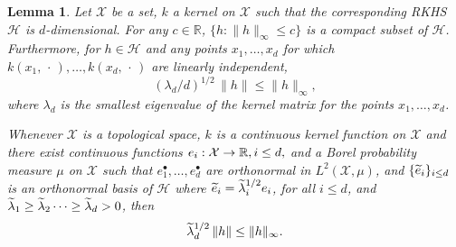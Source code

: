 \documentclass[10pt]{amsart}
\newtheorem{lemm}[theo]{Lemma}\newtheorem{prop}[theo]{Proposition}\newtheorem{coro}[theo]{Corollary}\newtheorem{conj}[theo]{Conjecture}
\theoremstyle{definition}\newtheorem{defi}[theo]{Definition}\newtheorem{rema}[theo]{Remark}\newtheorem{exam}[theo]{Example}\newtheorem{exem}[theo]{Example}\newtheorem{nota}[theo]{Notation}
\theoremstyle{remark}
\newcommand{\R}{\mathbb{R}}
\newcommand{\X}{\mathcal{X}}
\newcommand{\cH}{\mathcal{H}}
\let\oldtilde\tilde
\renewcommand*{\tilde}[1]{\mathchoice{\widetilde{#1}}{\widetilde{#1}}{\oldtilde{#1}}{\oldtilde{#1}}}
\renewcommand*{\to}{\mathchoice{\longrightarrow}{\rightarrow}{\rightarrow}{\rightarrow}}
\begin{document}
\begin{lemm}\label{lem:tighter_lbnd}
Let $\X$ be a set, $k$ a kernel on $\X$ such that the corresponding RKHS $\cH$ is $d$-dimensional. For any $c\in \R$, $\{h : \|h\|_\infty \leq c \}$ is a compact subset of $\cH$. Furthermore, for $h \in \cH$ and any points $x_1,\dots,x_d$ for which $k(x_1,\,\cdot\,),\dots, k(x_d,\,\cdot\,)$ are linearly independent,
\[
(\lambda_d/d)^{1/2}\, \|h\| \leq \|h\|_\infty,
\]
where $\lambda_d$ is the smallest eigenvalue of the kernel matrix for the points $x_1,\dots,x_d$.

Whenever $\X$ is a topological space, $k$ is a continuous kernel function on $\X$ and there exist continuous functions $e_i: \X \to \R, i \leq d,$ and a Borel probability measure $\mu$ on $\X$ such that $e_1^\bullet,\dots, e_d^\bullet$ are orthonormal in $L^2(\X,\mu)$, and $\{\tilde e_i\}_{i\leq d}$ is an orthonormal basis of $\cH$ where $\tilde e_i = \tilde \lambda_i^{1/2} e_i$, for all $i \leq d$, and $\tilde \lambda_1 \geq \tilde \lambda_2 \dots \geq \tilde \lambda_d>0$, then
\[
\tilde \lambda_d^{1/2} \, \| h\| \leq \|h\|_\infty.
\]
\end{lemm}
\end{document}
